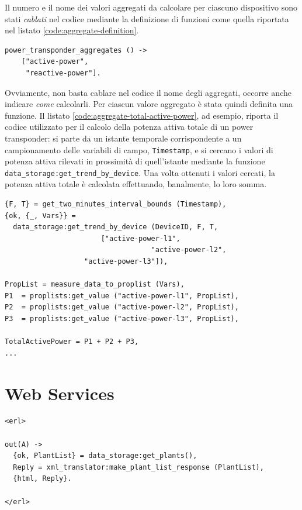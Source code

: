 %
Il numero e il nome dei valori aggregati da calcolare per ciascuno dispositivo
sono stati \emph{cablati} nel codice mediante la definizione di funzioni 
come quella riportata nel listato \ref{code:aggregate-definition}.
%
\begin{lstlisting}[caption={Definizione degli aggregati per il Power/Inverter Transponder}, label={code:aggregate-definition},frame=trBL]
power_transponder_aggregates () ->
    ["active-power",
     "reactive-power"].
\end{lstlisting}
%

%
Ovviamente, non basta cablare nel codice il nome degli aggregati, occorre anche 
indicare \emph{come} calcolarli.
%
Per ciascun valore aggregato \`e stata quindi definita una funzione.
%
Il listato \ref{code:aggregate-total-active-power}, ad esempio, riporta il codice 
utilizzato per il calcolo della potenza attiva totale di un power transponder: 
si parte da un istante temporale corrispondente a un campionamento delle variabili di 
campo, \texttt{Timestamp}, e si cercano i valori di potenza attiva rilevati in prossimit\`a
di quell'istante mediante la funzione \texttt{data\_storage:get\_trend\_by\_device}.
%
Una volta ottenuti i valori cercati, la potenza attiva totale \`e calcolata effettuando,
banalmente, lo loro somma.
%
\begin{lstlisting}[caption={Calcolo della potenza attiva totale}, label={code:aggregate-total-active-power},frame=trBL]
{F, T} = get_two_minutes_interval_bounds (Timestamp),
{ok, {_, Vars}} = 
  data_storage:get_trend_by_device (DeviceID, F, T, 
   			           ["active-power-l1",
                                   "active-power-l2",
				   "active-power-l3"]),
	      
PropList = measure_data_to_proplist (Vars),
P1  = proplists:get_value ("active-power-l1", PropList),
P2  = proplists:get_value ("active-power-l2", PropList),
P3  = proplists:get_value ("active-power-l3", PropList),
	      
TotalActivePower = P1 + P2 + P3, 
...
\end{lstlisting}
%

%
\section{Web Services}



\begin{lstlisting}[caption={Servizio \texttt{plant\_list}}, label={code:restful-ws},frame=trBL]
<erl>

out(A) ->
  {ok, PlantList} = data_storage:get_plants(),
  Reply = xml_translator:make_plant_list_response (PlantList),
  {html, Reply}.

</erl>
\end{lstlisting}


